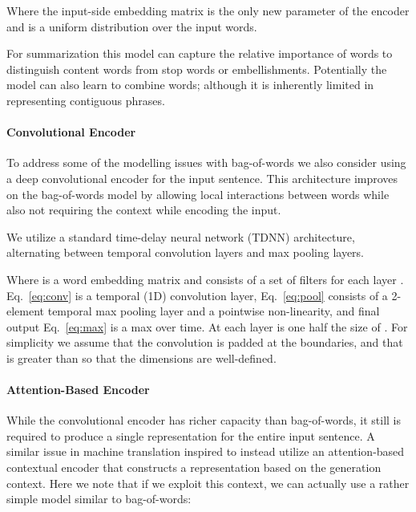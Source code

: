 \documentclass[11pt,a4paper]{article}
\begin{document}
\noindent Where the input-side embedding matrix  is the only new parameter of the encoder 
 and  is a
uniform distribution over the input words.

For summarization this model can
capture the relative importance of words to distinguish content words
from stop words or embellishments. Potentially the model can also
learn to combine words; although it is inherently limited in
representing contiguous phrases.

\paragraph{Convolutional Encoder}

To address some of the modelling issues with bag-of-words
we also consider using a deep convolutional encoder for the input
sentence. This architecture improves on the bag-of-words model by
allowing local interactions between words while also not requiring the
context  while encoding the input.

We utilize a standard time-delay neural network (TDNN) architecture,
alternating between temporal convolution layers and max pooling
layers.

\begin{small}

\end{small}
Where  is a word embedding matrix and  consists of a set of filters for each layer .  Eq.~\ref{eq:conv} is a temporal (1D) convolution layer,
Eq.~\ref{eq:pool} consists of a 2-element temporal max pooling layer
and a pointwise non-linearity, and final output Eq.~\ref{eq:max} is a
max over time. At each layer  is one half the size of
. For simplicity we assume that the convolution is padded at
the boundaries, and that  is greater than  so that the
dimensions are well-defined. 

\paragraph{Attention-Based Encoder}

While the convolutional encoder has richer capacity than bag-of-words, it
still is required to produce a single representation for the entire
input sentence. A similar issue in machine translation inspired 
 to instead utilize an attention-based 
contextual encoder that constructs a representation based on the 
generation context. Here we note that if we exploit this context, we 
can actually use a rather simple model similar to bag-of-words:
\end{document}
